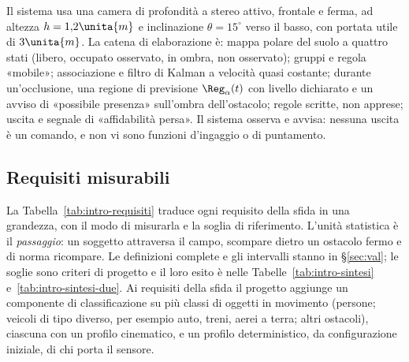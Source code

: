 Il sistema usa una camera di profondità a stereo attivo, frontale e ferma, ad altezza $h=1{,}2\unita{m}$ e inclinazione $\theta=15^\circ$ verso il basso, con portata utile di $3\unita{m}$. La catena di elaborazione è: mappa polare del suolo a quattro stati (libero, occupato osservato, in ombra, non osservato); gruppi e regola «mobile»; associazione e filtro di Kalman \cite{kalman1960} a velocità quasi costante; durante un'occlusione, una regione di previsione $\Reg_\alpha(t)$ con livello dichiarato e un avviso di «possibile presenza» sull'ombra dell'ostacolo; regole scritte, non apprese; uscita e segnale di «affidabilità persa». Il sistema osserva e avvisa: nessuna uscita è un comando, e non vi sono funzioni d'ingaggio o di puntamento.

\subsection{Requisiti misurabili}\label{sec:intro-requisiti}

La Tabella~\ref{tab:intro-requisiti} traduce ogni requisito della sfida in una grandezza, con il modo di misurarla e la soglia di riferimento. L'unità statistica è il \emph{passaggio}: un soggetto attraversa il campo, scompare dietro un ostacolo fermo e di norma ricompare. Le definizioni complete e gli intervalli stanno in \S\ref{sec:val}; le soglie sono criteri di progetto e il loro esito è nelle Tabelle~\ref{tab:intro-sintesi} e~\ref{tab:intro-sintesi-due}. Ai requisiti della sfida il progetto aggiunge un componente di classificazione su più classi di oggetti in movimento (persone; veicoli di tipo diverso, per esempio auto, treni, aerei a terra; altri ostacoli), ciascuna con un profilo cinematico, e un profilo deterministico, da configurazione iniziale, di chi porta il sensore.

